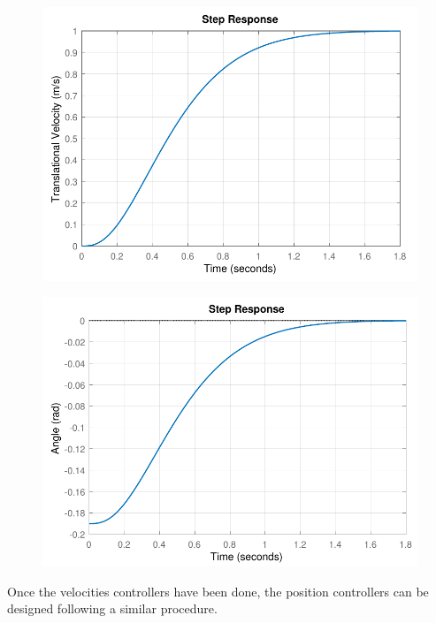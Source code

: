\begin{minipage}{\linewidth}
    \begin{minipage}{0.5\linewidth}
        \begin{figure}[H]
            \includegraphics[scale=.55]{figures/stepVelocity}
            \centering
            \label{fig:stepVelocity}
        \end{figure}
    \end{minipage}
    \hspace{0.03\linewidth}
    \begin{minipage}{0.5\linewidth}
        \begin{figure}[H]
            \includegraphics[scale=.55]{figures/stepVelocityControlAction}
            \centering
            \label{fig:stepVelocityControlAction}
        \end{figure}
    \end{minipage}
\end{minipage}
%
Once the velocities controllers have been done, the position controllers can be designed following a similar procedure.

